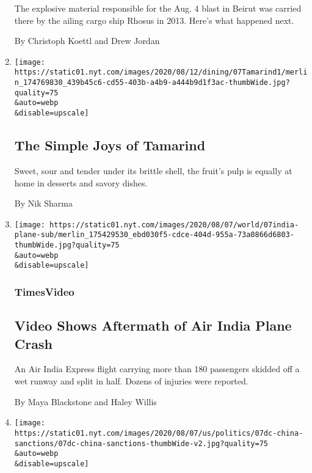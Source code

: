 \begin{enumerate}
  The explosive material responsible for the Aug. 4 blast in Beirut was
  carried there by the ailing cargo ship Rhosus in 2013. Here's what
  happened next.

  By Christoph Koettl and Drew Jordan
\item
  \href{/2020/08/07/dining/tamarind-recipes.html}{}

  \texttt{[image: https://static01.nyt.com/images/2020/08/12/dining/07Tamarind1/merlin\_174769830\_439b45c6-cd55-403b-a4b9-a444b9d1f3ac-thumbWide.jpg?quality=75\\\&auto=webp\\\&disable=upscale]}

  \hypertarget{the-simple-joys-of-tamarind}{%
  \subsection{The Simple Joys of
  Tamarind}\label{the-simple-joys-of-tamarind}}

  Sweet, sour and tender under its brittle shell, the fruit's pulp is
  equally at home in desserts and savory dishes.

  By Nik Sharma
\item
  \href{/video/world/100000007278318/air-india-plane-crash-video.html}{}

  \texttt{[image: https://static01.nyt.com/images/2020/08/07/world/07india-plane-sub/merlin\_175429530\_ebd030f5-cdce-404d-955a-73a0866d6803-thumbWide.jpg?quality=75\\\&auto=webp\\\&disable=upscale]}

  \hypertarget{timesvideo}{%
  \subsubsection{TimesVideo}\label{timesvideo}}

  \hypertarget{video-shows-aftermath-of-air-india-plane-crash}{%
  \subsection{Video Shows Aftermath of Air India Plane
  Crash}\label{video-shows-aftermath-of-air-india-plane-crash}}

  An Air India Express flight carrying more than 180 passengers skidded
  off a wet runway and split in half. Dozens of injuries were reported.

  By Maya Blackstone and Haley Willis
\item
  \href{/2020/08/07/world/asia/trump-china-hong-kong-sanctions.html}{}

  \texttt{[image: https://static01.nyt.com/images/2020/08/07/us/politics/07dc-china-sanctions/07dc-china-sanctions-thumbWide-v2.jpg?quality=75\\\&auto=webp\\\&disable=upscale]}


\end{enumerate}
